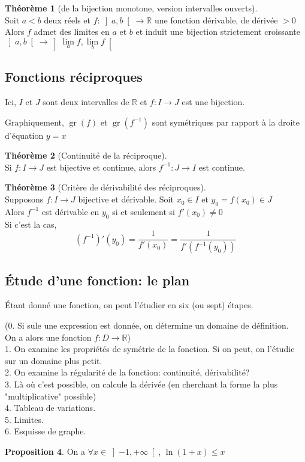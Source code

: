 \documentclass[10pt,a4paper]{article}
\theoremstyle{definition}
\newtheorem{proposition}{Proposition}[section]
\newtheorem{theorem}[proposition]{Théorème}
\DeclareMathOperator{\gr}{gr}
\begin{document}
\begin{theorem}[de la bijection monotone, version intervalles ouverts]
\hfill \\
Soit $a < b$ deux réels et $f: \left] a, b \right[ \to \mathbb{R}$ une fonction dérivable, de dérivée $> 0$ \\
Alors $f$ admet des limites en $a$ et $b$ et induit une bijection strictement croissante $\left] a, b \right[ \to \left] \lim\limits_a f, \lim\limits_b f \right[$
\end{theorem}

\subsection{Fonctions réciproques}
Ici, $I$ et $J$ sont deux intervalles de $\mathbb{R}$ et $f: I \to J$ est une bijection. \medskip

Graphiquement, $\gr(f)$ et $\gr(f^{-1})$ sont symétriques par rapport à la droite d'équation $y = x$
\begin{theorem}[Continuité de la réciproque]
\hfill \\
Si $f: I \to J$ est bijective et continue, alors $f^{-1}: J \to I$ est continue.
\end{theorem}
\begin{theorem}[Critère de dérivabilité des réciproques]
\hfill \\
Supposons $f: I \to J$ bijective et dérivable. Soit $x_0 \in I$ et $y_0 =f(x_0) \in J$ \\
Alors $f^{-1}$ est dérivable en $y_0$ si et seulement si $f'(x_0) \neq 0$ \\
Si c'est la cas,
\[ \left(f^{-1}\right)'(y_0) = \frac{1}{f'(x_0)	} = \frac{1}{f'(f^{-1}(y_0))}\]
\end{theorem}

\pagebreak

\subsection{Étude d'une fonction: le plan}
\noindent Étant donné une fonction, on peut l'étudier en six (ou sept) étapes. \medskip

\noindent (0. Si sule une expression est donnée, on détermine un domaine de définition. \\
On a alors une fonction $f: D \to \mathbb{R}$) \\
1. On examine les propriétés de symétrie de la fonction. Si on peut, on l'étudie sur un domaine plus petit. \\
2. On examine la régularité de la fonction: continuité, dérivabilité? \\
3. Là où c'est possible, on calcule la dérivée (en cherchant la forme la plus "multiplicative" possible) \\
4. Tableau de variations. \\
5. Limites. \\
6. Esquisse de graphe.
\begin{proposition}
On a $\forall x \in \left] -1, +\infty \right[$, $\ln( 1 + x ) \leq x$
\end{proposition}
\end{document}
